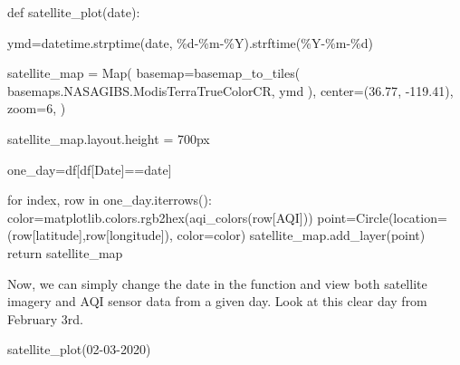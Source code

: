 \documentclass[
  letterpaper,
  DIV=11,
  numbers=noendperiod]{scrreprt}
\newenvironment{Shaded}{\begin{snugshade}}{\end{snugshade}}
\newcommand{\ControlFlowTok}[1]{\textcolor[rgb]{0.00,0.23,0.31}{#1}}
\newcommand{\DecValTok}[1]{\textcolor[rgb]{0.68,0.00,0.00}{#1}}
\newcommand{\FloatTok}[1]{\textcolor[rgb]{0.68,0.00,0.00}{#1}}
\newcommand{\KeywordTok}[1]{\textcolor[rgb]{0.00,0.23,0.31}{#1}}
\newcommand{\NormalTok}[1]{\textcolor[rgb]{0.00,0.23,0.31}{#1}}
\newcommand{\OperatorTok}[1]{\textcolor[rgb]{0.37,0.37,0.37}{#1}}
\newcommand{\SpecialCharTok}[1]{\textcolor[rgb]{0.37,0.37,0.37}{#1}}
\newcommand{\StringTok}[1]{\textcolor[rgb]{0.13,0.47,0.30}{#1}}
\begin{document}
\begin{Shaded}
\begin{Highlighting}[]
\KeywordTok{def}\NormalTok{ satellite\_plot(date):}
  
\NormalTok{  ymd}\OperatorTok{=}\NormalTok{datetime.strptime(date, }\StringTok{\textquotesingle{}}\SpecialCharTok{\%d}\StringTok{{-}\%m{-}\%Y\textquotesingle{}}\NormalTok{).strftime(}\StringTok{\textquotesingle{}\%Y{-}\%m{-}}\SpecialCharTok{\%d}\StringTok{\textquotesingle{}}\NormalTok{)}

\NormalTok{  satellite\_map }\OperatorTok{=}\NormalTok{ Map(}
\NormalTok{    basemap}\OperatorTok{=}\NormalTok{basemap\_to\_tiles(}
\NormalTok{      basemaps.NASAGIBS.ModisTerraTrueColorCR, ymd}
\NormalTok{    ),}
\NormalTok{    center}\OperatorTok{=}\NormalTok{(}\FloatTok{36.77}\NormalTok{, }\OperatorTok{{-}}\FloatTok{119.41}\NormalTok{),}
\NormalTok{    zoom}\OperatorTok{=}\DecValTok{6}\NormalTok{,}
\NormalTok{  )}

\NormalTok{  satellite\_map.layout.height }\OperatorTok{=} \StringTok{\textquotesingle{}700px\textquotesingle{}}

\NormalTok{  one\_day}\OperatorTok{=}\NormalTok{df[df[}\StringTok{\textquotesingle{}Date\textquotesingle{}}\NormalTok{]}\OperatorTok{==}\NormalTok{date]}

  \ControlFlowTok{for}\NormalTok{ index, row }\KeywordTok{in}\NormalTok{ one\_day.iterrows():}
\NormalTok{    color}\OperatorTok{=}\NormalTok{matplotlib.colors.rgb2hex(aqi\_colors(row[}\StringTok{\textquotesingle{}AQI\textquotesingle{}}\NormalTok{]))}
\NormalTok{    point}\OperatorTok{=}\NormalTok{Circle(location}\OperatorTok{=}\NormalTok{(row[}\StringTok{\textquotesingle{}latitude\textquotesingle{}}\NormalTok{],row[}\StringTok{\textquotesingle{}longitude\textquotesingle{}}\NormalTok{]), color}\OperatorTok{=}\NormalTok{color)}
\NormalTok{    satellite\_map.add\_layer(point)}
  \ControlFlowTok{return}\NormalTok{ satellite\_map}

\end{Highlighting}
\end{Shaded}

Now, we can simply change the date in the function and view both
satellite imagery and AQI sensor data from a given day. Look at this
clear day from February 3rd.

\begin{Shaded}
\begin{Highlighting}[]
\NormalTok{satellite\_plot(}\StringTok{\textquotesingle{}02{-}03{-}2020\textquotesingle{}}\NormalTok{)}
\end{Highlighting}
\end{Shaded}
\end{document}
